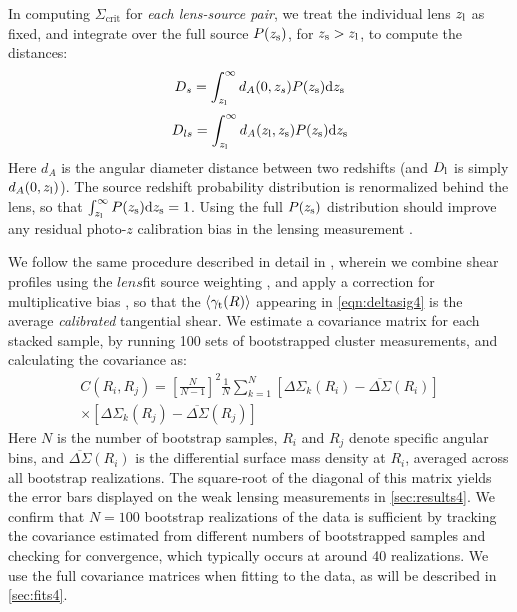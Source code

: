 In computing $\Sigma_{\mathrm{crit}}$ for {\it each lens-source pair}, we treat the individual lens $z_{\rm l}$ as fixed, and integrate over the full source $P(z_{\rm s})$, for $z_{\rm s} > z_{\rm l}$, to compute the distances:
\begin{equation}
D_s = \int_{z_{\rm l}}^{\infty} d_A(0,z_s) P(z_{\rm s}) {\rm d}z_{\rm s}
\end{equation}
\begin{equation}
D_{ls} = \int_{z_{\rm l}}^{\infty} d_A(z_{\rm l},z_{\rm s}) P(z_{\rm s}) {\rm d}z_{\rm s}
\end{equation}
Here $d_A$ is the angular diameter distance between two redshifts (and $D_{\rm l}$ is simply $d_A(0,z_{\rm l})$). The source redshift probability distribution is renormalized behind the lens, so that $\int_{z_{\rm l}}^{\infty} P(z_{\rm s}) {\rm d}z_{\rm s} = 1$. Using the full $P(z_{\rm s})$ distribution should improve any residual photo-$z$ calibration bias in the lensing measurement \citep{Mandelbaum08a}.

We follow the same procedure described in detail in \citet{Velander14}, wherein we combine shear profiles using the $lens$fit source weighting \citep[Equation 8 of][]{Miller13}, and apply a correction for multiplicative bias \citep{Miller13}, so that the $\langle \gamma_{\rm t}(R) \rangle$ appearing in \autoref{eqn:deltasig4} is the average {\it calibrated} tangential shear. We estimate a covariance matrix for each stacked sample, by running 100 sets of bootstrapped cluster measurements, and calculating the covariance as:
\begin{equation}
\begin{split}
C(R_i,R_j) = \left[ \frac{N}{N-1} \right]^2 \frac{1}{N} \sum_{k=1}^{N} \left[\Delta\Sigma_k(R_i) - \overline{\Delta\Sigma}(R_i)\right] \\
\times \left[\Delta\Sigma_k(R_j) - \overline{\Delta\Sigma}(R_j)\right]
\end{split}
\end{equation}
Here $N$ is the number of bootstrap samples, $R_i$ and $R_j$ denote specific angular bins, and $\overline{\Delta\Sigma}(R_i)$ is the differential surface mass density at $R_i$, averaged across all bootstrap realizations. The square-root of the diagonal of this matrix yields the error bars displayed on the weak lensing measurements in \autoref{sec:results4}. We confirm that $N=100$ bootstrap realizations of the data is sufficient by tracking the covariance estimated from different numbers of bootstrapped samples and checking for convergence, which typically occurs at around 40 realizations. We use the full covariance matrices when fitting to the data, as will be described in \autoref{sec:fits4}.

